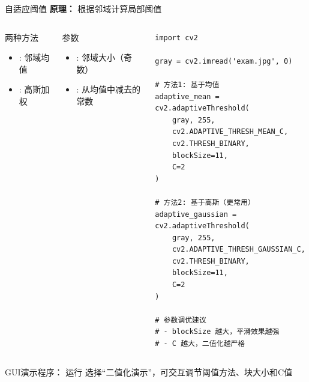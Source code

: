 \begin{frame}[fragile]{自适应阈值}
    \textbf{原理：} 根据邻域计算局部阈值

    \begin{columns}
        \begin{block}{两种方法}
            \begin{itemize}
                \item {}: 邻域均值
                \item {}: 高斯加权
            \end{itemize}
        \end{block}

        \begin{block}{参数}
            \begin{itemize}
                \item {}: 邻域大小（奇数）
                \item {}: 从均值中减去的常数
            \end{itemize}
        \end{block}

        \begin{lstlisting}[basicstyle=\ttfamily\scriptsize]
import cv2

gray = cv2.imread('exam.jpg', 0)

# 方法1: 基于均值
adaptive_mean = cv2.adaptiveThreshold(
    gray, 255,
    cv2.ADAPTIVE_THRESH_MEAN_C,
    cv2.THRESH_BINARY,
    blockSize=11,
    C=2
)

# 方法2: 基于高斯（更常用）
adaptive_gaussian = cv2.adaptiveThreshold(
    gray, 255,
    cv2.ADAPTIVE_THRESH_GAUSSIAN_C,
    cv2.THRESH_BINARY,
    blockSize=11,
    C=2
)

# 参数调优建议
# - blockSize 越大，平滑效果越强
# - C 越大，二值化越严格
        \end{lstlisting}
    \end{columns}

    \begin{alertblock}{GUI演示程序：}
		运行  选择“二值化演示”，可交互调节阈值方法、块大小和C值
    \end{alertblock}
\end{frame}

